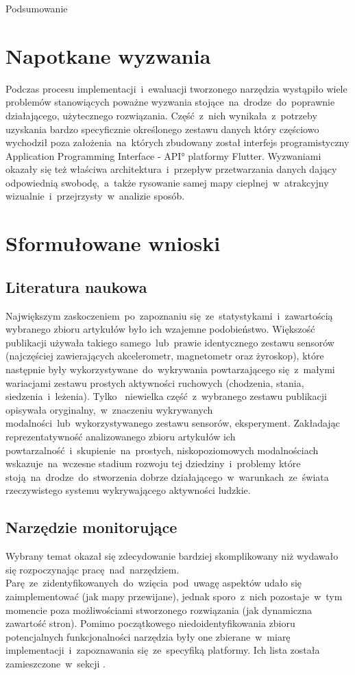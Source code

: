 \begin{chapter}{Podsumowanie}
	\section{Napotkane wyzwania}
	Podczas procesu implementacji~i~ewaluacji tworzonego narzędzia wystąpiło wiele problemów stanowiących poważne wyzwania stojące~na~drodze~do~poprawnie działającego, użytecznego rozwiązania. Część~z~nich wynikała~z~potrzeby uzyskania bardzo specyficznie określonego zestawu danych który częściowo wychodził poza założenia~na~których zbudowany został interfejs programistyczny \ang{Application Programming Interface - API} platformy Flutter. Wyzwaniami okazały się też właściwa architektura~i~przepływ przetwarzania danych dający odpowiednią swobodę,~a~także rysowanie samej mapy cieplnej~w~atrakcyjny wizualnie~i~przejrzysty~w~analizie sposób.
	
	\section{Sformułowane wnioski}
	
	\subsection{Literatura naukowa}
	Największym zaskoczeniem~po~zapoznaniu się~ze~statystykami~i~zawartością wybranego zbioru artykułów było ich wzajemne podobieństwo. Większość publikacji używała takiego samego~lub~prawie identycznego zestawu sensorów (najczęściej zawierających akcelerometr, magnetometr oraz żyroskop), które następnie były wykorzystywane~do~wykrywania powtarzającego się~z~małymi wariacjami zestawu prostych aktywności ruchowych (chodzenia, stania, siedzenia~i~leżenia). Tylko~ niewielka część~z~wybranego zestawu publikacji opisywała oryginalny,~w~znaczeniu wykrywanych modalności~lub~wykorzystywanego zestawu sensorów, eksperyment. Zakładając reprezentatywność analizowanego zbioru artykułów ich powtarzalność~i~skupienie~na~prostych, niskopoziomowych modalnościach wskazuje~na~wczesne stadium rozwoju tej dziedziny~i~problemy które stoją~na~drodze~do~stworzenia dobrze działającego~w~warunkach~ze~świata rzeczywistego systemu wykrywającego aktywności ludzkie.
	
	\subsection{Narzędzie monitorujące}
	Wybrany temat okazał się zdecydowanie bardziej skomplikowany niż wydawało się rozpoczynając pracę~nad~narzędziem. Parę~ze~zidentyfikowanych~do~wzięcia~pod~uwagę aspektów udało się zaimplementować (jak mapy przewijane), jednak sporo~z~nich pozostaje~w~tym momencie poza możliwościami stworzonego rozwiązania (jak dynamiczna zawartość stron). Pomimo początkowego niedoidentyfikowania zbioru potencjalnych funkcjonalności narzędzia były one zbierane~w~miarę implementacji~i~zapoznawania się~ze~specyfiką platformy. Ich lista została zamieszczone~w~sekcji .
	

\end{chapter}
